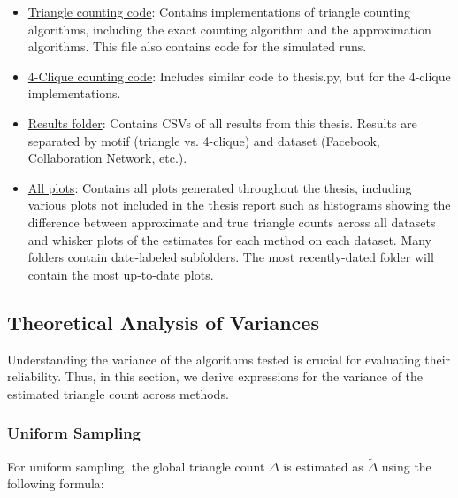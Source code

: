 \documentclass[11pt, margin=1in]{article}
\begin{document}
\begin{itemize}
    \item \href{https://github.com/sophia-hubscher/triangle-counting/blob/main/thesis.py}{Triangle counting code}: 
    Contains implementations of triangle counting algorithms, including the exact counting algorithm and the approximation algorithms. This file also contains code for the simulated runs.
    
    \item \href{https://github.com/sophia-hubscher/triangle-counting/blob/main/thesis_4_clique.py}{4-Clique counting code}: 
    Includes similar code to thesis.py, but for the 4-clique implementations.
    
    \item \href{https://github.com/sophia-hubscher/triangle-counting/tree/main/results}{Results folder}: 
    Contains CSVs of all results from this thesis. Results are separated by motif (triangle vs. 4-clique) and dataset (Facebook, Collaboration Network, etc.).

    \item \href{https://github.com/sophia-hubscher/triangle-counting/tree/main/plots}{All plots}:
    Contains all plots generated throughout the thesis, including various plots not included in the thesis report such as histograms showing the difference between approximate and true triangle counts across all datasets and whisker plots of the estimates for each method on each dataset. Many folders contain date-labeled subfolders. The most recently-dated folder will contain the most up-to-date plots.
\end{itemize}

\subsection{Theoretical Analysis of Variances}

Understanding the variance of the algorithms tested is crucial for evaluating their reliability.
Thus, in this section, we derive expressions for the variance of the estimated triangle count across methods.

\subsubsection{Uniform Sampling}

For uniform sampling, the global triangle count $\Delta$ is estimated as $\tilde{\Delta}$ using the following formula:
\end{document}
